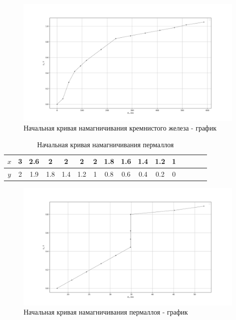 \documentclass[12pt]{lab}
\begin{document}
\begin{enumerate}
        \begin{figure}[H]
            \includegraphics[width=\textwidth]{pics/graph1.png}
            \caption{Начальная кривая намагничивания кремнистого железа - график}
        \end{figure}

        \begin{table}[H]
            \caption{Начальная кривая намагничивания пермаллоя}
            \begin{center}
                \begin{tabular}{|c|*{15}{c|}}\hline
                    $x$ & 3 & 2.6 & 2 & 2 & 2 & 2 & 1.8 & 1.6 & 1.4 & 1.2 & 1\\\hline
                    $y$ & 2 & 1.9 & 1.8 & 1.4 & 1.2 & 1 & 0.8 & 0.6 & 0.4 & 0.2 & 0\\\hline
                \end{tabular}
            \end{center}
        \end{table}

        \begin{figure}[H]
            \includegraphics[width=\textwidth]{graph2.png}
            \caption{Начальная кривая намагничивания пермаллоя - график}
        \end{figure}


\end{enumerate}
\end{document}
